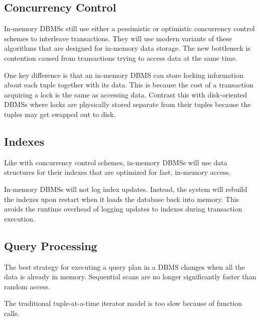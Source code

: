 \documentclass[11pt]{article}
\begin{document}
\subsection*{Concurrency Control}
In-memory DBMSs still use either a pessimistic or optimistic concurrency control 
schemes to interleave transactions. They will use modern variants of these algorithms that are 
designed for in-memory data storage.
The new bottleneck is contention caused from transactions trying to access data at the 
same time.

One key difference is that an in-memory DBMS can store locking information about each tuple 
together with its data. This is because the cost of a transaction acquiring a lock is 
the same as accessing data. Contrast this with disk-oriented DBMSs where locks are physically 
stored separate from their tuples because the tuples may get swapped out to disk.

\subsection*{Indexes}
Like with concurrency control schemes, in-memory DBMSs will use data structures for their indexes 
that are optimized for fast, in-memory access.

In-memory DBMSs will not log index updates. Instead, the system will rebuild the indexes upon 
restart when it loads the database back into memory. This avoids the runtime overhead of 
logging updates to indexes during transaction execution.
    
\subsection*{Query Processing}
The best strategy for executing a query plan in a DBMS changes when all the data is 
already in memory. Sequential scans are no longer significantly faster than random access.
        
The traditional tuple-at-a-time iterator model is too slow because of function calls.
    
\end{document}

